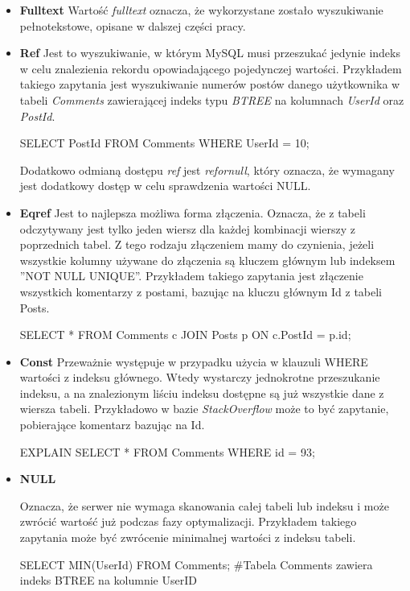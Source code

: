 \begin{itemize}
\item \textbf{Fulltext} \newline Wartość \textit{fulltext} oznacza, że wykorzystane zostało wyszukiwanie pełnotekstowe, opisane w dalszej części pracy.
\item \textbf{Ref}
\newline Jest to wyszukiwanie, w którym MySQL musi przeszukać jedynie indeks w celu znalezienia rekordu opowiadającego pojedynczej wartości.
Przykładem takiego zapytania jest wyszukiwanie numerów postów danego użytkownika w tabeli \textit{Comments} zawierającej indeks typu \textit{BTREE} na kolumnach \textit{UserId} oraz \textit{PostId}.

\begin{spverbatim}
	SELECT PostId FROM Comments WHERE UserId = 10;
\end{spverbatim}
Dodatkowo odmianą dostępu \textit{ref} jest \textit{ref\textunderscore or\textunderscore null}, który oznacza, że wymagany jest dodatkowy dostęp w celu sprawdzenia wartości NULL.

\item \textbf{Eq\textunderscore ref} \newline Jest to najlepsza możliwa forma złączenia. Oznacza, że z tabeli odczytywany jest tylko jeden wiersz dla każdej kombinacji wierszy z poprzednich tabel. Z tego rodzaju złączeniem mamy do czynienia, jeżeli wszystkie kolumny używane do złączenia są kluczem głównym lub indeksem ''NOT NULL UNIQUE''. Przykładem takiego zapytania jest złączenie wszystkich komentarzy z postami, bazując na kluczu głównym Id z tabeli Posts. 
\begin{spverbatim}
	SELECT * FROM Comments c JOIN Posts p ON c.PostId = p.id;
\end{spverbatim}

\item \textbf{Const} \newline 
Przeważnie występuje w przypadku użycia w klauzuli WHERE wartości z indeksu głównego. Wtedy wystarczy jednokrotne przeszukanie indeksu, a na znalezionym liściu indeksu dostępne są już wszystkie dane z wiersza tabeli. Przykładowo w bazie \textit{StackOverflow} może to być zapytanie, pobierające komentarz bazując na Id.
\begin{spverbatim}
	EXPLAIN SELECT * FROM Comments WHERE id = 93;
\end{spverbatim}


\item {\textbf{NULL}}
\newline

Oznacza, że serwer nie wymaga skanowania całej tabeli lub indeksu i może zwrócić wartość już podczas fazy optymalizacji. Przykładem takiego zapytania może być zwrócenie minimalnej wartości z indeksu tabeli.

\begin{spverbatim}
	SELECT MIN(UserId) FROM Comments;
	#Tabela Comments zawiera indeks BTREE na kolumnie UserID
\end{spverbatim}

\end{itemize}

